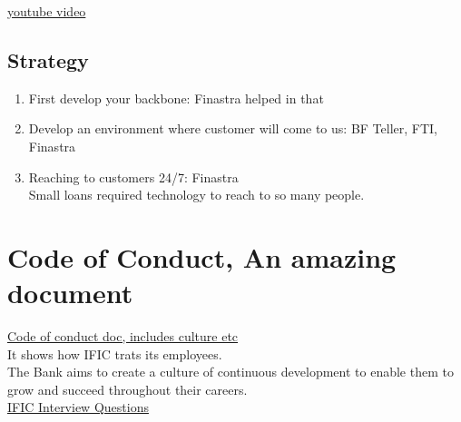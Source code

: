 \documentclass[11pt]{article}
\begin{document}
\href{https://www.youtube.com/watch?v=jy7Ug1pm3aQ}{youtube video}\\
\subsection{Strategy}
\label{sec:orgc425e68}
\begin{enumerate}
\item First develop your backbone: Finastra helped in that\\
\item Develop an environment where customer will come to us: BF Teller, FTI, Finastra\\
\item Reaching to customers 24/7: Finastra\\

Small loans required technology to reach to so many people.\\
\end{enumerate}
\section{Code of Conduct, An amazing document}
\label{sec:orgcadd4ad}
\href{https://ificbank.com.bd/public/assets/investor/human-capital.pdf}{Code of conduct doc, includes culture etc}\\
It shows how IFIC trats its employees.\\

The Bank aims to create a culture of continuous development to enable them to grow and succeed throughout their careers.\\

\href{https://www.glassdoor.com/Interview/IFIC-Bank-Interview-Questions-E558323.htm}{IFIC Interview Questions}\\
\end{document}
